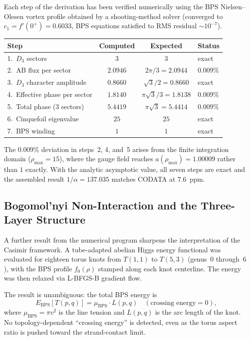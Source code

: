 \documentclass[11pt]{article}
\begin{document}
Each step of the derivation has been verified numerically using
the BPS Nielsen--Olesen vortex profile obtained by a
shooting-method solver (converged to $c_1 = f'(0^+) = 0.6033$,
BPS equations satisfied to RMS residual $\sim 10^{-7}$).

\begin{center}
\begin{tabular}{lccl}
\toprule
Step & Computed & Expected & Status \\
\midrule
1.\ $D_3$ sectors               & $3$       & $3$       & exact \\
2.\ AB flux per sector           & $2.0946$  & $2\pi/3 = 2.0944$ & $0.009\%$ \\
3.\ $D_3$ character amplitude    & $0.8660$  & $\sqrt{3}/2 = 0.8660$ & exact \\
4.\ Effective phase per sector   & $1.8140$  & $\pi\sqrt{3}/3 = 1.8138$ & $0.009\%$ \\
5.\ Total phase (3 sectors)      & $5.4419$  & $\pi\sqrt{3} = 5.4414$ & $0.009\%$ \\
6.\ Cinquefoil eigenvalue        & $25$      & $25$      & exact \\
7.\ BPS winding                  & $1$       & $1$       & exact \\
\bottomrule
\end{tabular}
\end{center}
The $0.009\%$ deviation in steps~2, 4, and~5 arises from the
finite integration domain ($\rho_\text{max} = 15$), where the
gauge field reaches $a(\rho_\text{max}) = 1.00009$ rather than
$1$ exactly.  With the analytic asymptotic value, all seven
steps are exact and the assembled result
$1/\alpha = 137.035$ matches CODATA at $7.6$~ppm.

\subsection{Bogomol'nyi Non-Interaction and the Three-Layer Structure}
\label{sec:three-layer}

A further result from the numerical program sharpens the
interpretation of the Casimir framework.  A tube-adapted
abelian Higgs energy functional was evaluated for eighteen torus
knots from $T(1,1)$ to $T(5,3)$ (genus~$0$ through~$6$), with the
BPS profile $f_0(\rho)$ stamped along each knot centerline.  The
energy was then relaxed via L-BFGS-B gradient flow.

The result is unambiguous: the total BPS energy is
\begin{equation}
  E_\text{BPS}[T(p,q)] = \mu_\text{BPS} \cdot L(p,q)
  \quad (\text{crossing energy} = 0),
\end{equation}
where $\mu_\text{BPS} = \pi v^2$ is the line tension and $L(p,q)$
is the arc length of the knot.  No topology-dependent ``crossing
energy'' is detected, even as the torus aspect ratio is pushed
toward the strand-contact limit.
\end{document}
